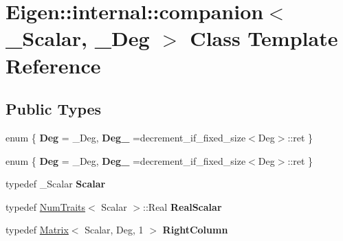 \hypertarget{class_eigen_1_1internal_1_1companion}{}\section{Eigen\+:\+:internal\+:\+:companion$<$ \+\_\+\+Scalar, \+\_\+\+Deg $>$ Class Template Reference}
\label{class_eigen_1_1internal_1_1companion}
\subsection*{Public Types}
\begin{DoxyCompactItemize}
\item 
\mbox{\label{class_eigen_1_1internal_1_1companion_ad64ae5544221677d872b79b32546143c}} 
enum \{ {\bfseries Deg} = \+\_\+\+Deg, 
{\bfseries Deg\+\_} =decrement\+\_\+if\+\_\+fixed\+\_\+size$<$Deg$>$\+:\+:ret
 \}
\item 
\mbox{\label{class_eigen_1_1internal_1_1companion_adfca45576725c91ca6c53ce30a8310d0}} 
enum \{ {\bfseries Deg} = \+\_\+\+Deg, 
{\bfseries Deg\+\_} =decrement\+\_\+if\+\_\+fixed\+\_\+size$<$Deg$>$\+:\+:ret
 \}
\item 
\mbox{\label{class_eigen_1_1internal_1_1companion_a061d1e325a0417ef9cb926133d833e39}} 
typedef \+\_\+\+Scalar {\bfseries Scalar}
\item 
\mbox{\label{class_eigen_1_1internal_1_1companion_a1c462f30c15c1a6233192a2c348139d6}} 
typedef \hyperlink{group___core___module_struct_eigen_1_1_num_traits}{Num\+Traits}$<$ Scalar $>$\+::Real {\bfseries Real\+Scalar}
\item 
\mbox{\label{class_eigen_1_1internal_1_1companion_a69824f07c37938d96dae2e5e4fc97718}} 
typedef \hyperlink{group___core___module_class_eigen_1_1_matrix}{Matrix}$<$ Scalar, Deg, 1 $>$ {\bfseries Right\+Column}
\item 
\mbox{\label{class_eigen_1_1internal_1_1companion_aad7128996067bbf85be2bb7ca8d287d7}} 

\end{DoxyCompactItemize}
